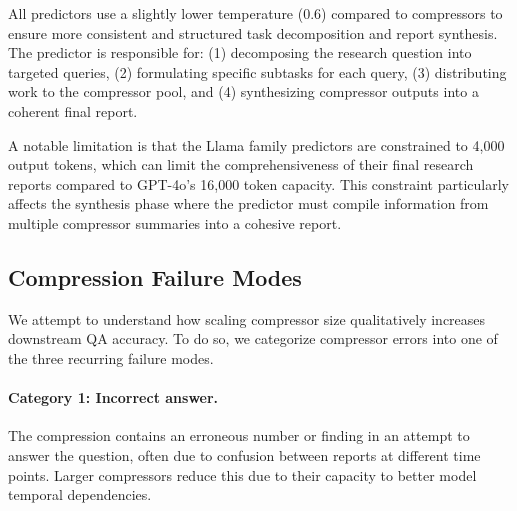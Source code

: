 \documentclass{article} %
\begin{document}
All predictors use a slightly lower temperature (0.6) compared to compressors to ensure more consistent and structured task decomposition and report synthesis. The predictor is responsible for: (1) decomposing the research question into targeted queries, (2) formulating specific subtasks for each query, (3) distributing work to the compressor pool, and (4) synthesizing compressor outputs into a coherent final report.

A notable limitation is that the Llama family predictors are constrained to 4,000 output tokens, which can limit the comprehensiveness of their final research reports compared to GPT-4o's 16,000 token capacity. This constraint particularly affects the synthesis phase where the predictor must compile information from multiple compressor summaries into a cohesive report.

\subsection{Compression Failure Modes}
\label{sec:appendix-failure-modes-compression}

We attempt to understand how scaling compressor size qualitatively increases downstream QA accuracy. To do so, we categorize compressor errors into one of the three recurring failure modes.


\paragraph*{Category 1: Incorrect answer.}   
The compression contains an erroneous number or finding in an attempt to answer the question, often due to confusion between reports at different time points. Larger compressors reduce this due to their capacity to better model temporal dependencies.
\end{document}
